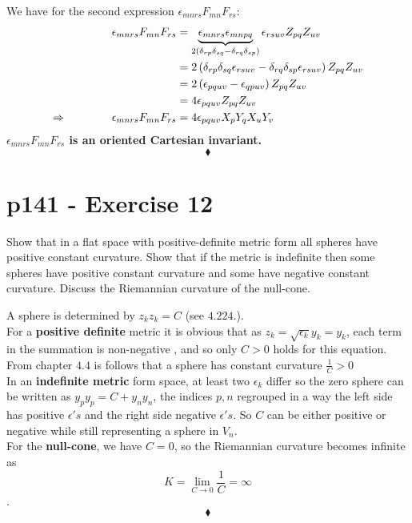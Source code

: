 We have for the second  expression $\epsilon_{mnrs} F_{mn}F_{rs}$:
\begin{align*}
\epsilon_{mnrs} F_{mn}F_{rs}&=\underbrace{\epsilon_{mnrs}\epsilon_{mnpq}}_{2\left(\delta_{rp}\delta_{sq}-\delta_{rq}\delta_{sp}\right) }\epsilon_{rsuv} Z_{pq} Z_{uv}\\
&=2\left(\delta_{rp}\delta_{sq}\epsilon_{rsuv}-\delta_{rq}\delta_{sp}\epsilon_{rsuv}\right)Z_{pq} Z_{uv}\\
&=2\left(\epsilon_{pquv}-\epsilon_{qpuv}\right)Z_{pq} Z_{uv}\\
&=4\epsilon_{pquv}Z_{pq} Z_{uv}\\
\Rightarrow \quad\quad\quad\quad \epsilon_{mnrs} F_{mn}F_{rs}&=4\epsilon_{pquv}X_p  Y_q X_uY_v
\end{align*}
\textbf{$\epsilon_{mnrs} F_{mn}F_{rs}$ is an oriented Cartesian invariant.}
$$\blacklozenge$$
\newpage

\section{p141 - Exercise 12}
\begin{tcolorbox}
Show that in a flat space with positive-definite metric form all spheres have positive constant curvature. Show that if the metric is indefinite then some spheres have positive constant curvature and some have negative constant curvature. Discuss the Riemannian curvature of the null-cone.
\end{tcolorbox}
A sphere is determined by $ z_kz_k= C$ (see $\mathbf{4.224.}$).\\
For a \textbf{positive definite} metric it is obvious that as $z_k= \sqrt{\epsilon_k}y_k = y_k$, each term in the summation is non-negative , and so only $C>0$ holds for this equation. From chapter $\mathbf{4.4}$ is follows that a sphere has constant curvature $\frac{1}{C} >0$\\
In an \textbf{indefinite metric} form space, at least two $\epsilon_k$ differ so the zero sphere can be written as $y_py_p=C +y_ny_n$, the indices $p, n$ regrouped in a way the left side has positive $\epsilon {'}s$ and the right side negative $\epsilon {'}s$. So $C$ can be either positive or negative while still representing a sphere in $V_n$.\\
For the \textbf{null-cone}, we have $C=0$, so the Riemannian curvature becomes infinite as $$K = \lim_{C\to 0}\frac{1}{C}= \infty$$.
$$\blacklozenge$$
\newpage

